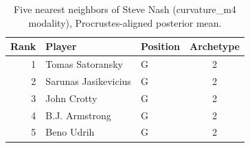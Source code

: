 \begin{table}[htbp]
  \centering\small
  \begin{tabular}{rllc}
    \toprule
    Rank & Player & Position & Archetype \\
    \midrule
    1 & Tomas Satoransky & G & 2 \\
    2 & Sarunas Jasikevicius & G & 2 \\
    3 & John Crotty & G & 2 \\
    4 & B.J. Armstrong & G & 2 \\
    5 & Beno Udrih & G & 2 \\
    \bottomrule
  \end{tabular}
  \caption{Five nearest neighbors of Steve Nash (curvature_m4 modality), Procrustes-aligned posterior mean.}
  \label{tab:Steve_Nash_neighbors_curvature_m4}
\end{table}


